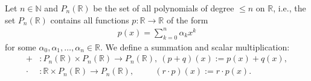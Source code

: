Let $n \in \mathbb{N}$ and $P_n(\mathbb{R})$ be the set of all polynomials of degree $\leq n$ on $\mathbb{R}$, i.e., the set $P_n(\mathbb{R})$ contains all functions $p:\mathbb{R} \rightarrow \mathbb{R}$ of the form
\begin{align*}
p(x) = \sum_{k=0}^n \alpha_k x^k
\end{align*}
for some $\alpha_0,\alpha_1, \dots,\alpha_n \in \mathbb{R}$. We define a summation and scalar multiplication:
\begin{align*}
+&\colon P_n(\mathbb{R}) \times P_n(\mathbb{R}) \to P_n(\mathbb{R}),~(p+q)(x) := p(x) + q(x),\\
\cdot &\colon  \mathbb{R} \times P_n(\mathbb{R}) \to P_n(\mathbb{R}),\quad\quad ~~(r\cdot p)(x) := r\cdot p(x) .
\end{align*}
